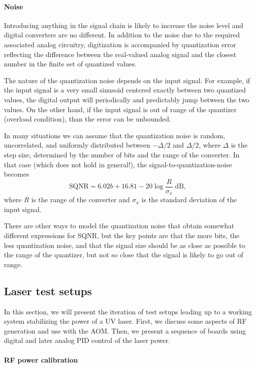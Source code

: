 \paragraph{Noise}

Introducing anything in the signal chain is likely to increase the noise level
and digital converters are no different. In addition to the noise due to the
required associated analog circuitry, digitization is accompanied by
quantization error reflecting the difference between the real-valued analog
signal and the closest number in the finite set of quantized values.

The nature of the quantization noise depends on the input signal. For example,
if the input signal is a very small sinusoid centered exactly between two
quantized values, the digital output will periodically and predictably jump
between the two values. On the other hand, if the input signal is out of range
of the quantizer (overload condition), than the error can be unbounded.

In many situations we can assume that the quantization noise is random,
uncorrelated, and uniformly distributed between $-\Delta/2$ and $\Delta/2$,
where $\Delta$ is the step size, determined by the number of bits and the range
of the converter. In that case (which does not hold in general!), the
signal-to-quantization-noise becomes \cite[sect~6.3.3]{proakis2006digital}
%
\[
   \text{SQNR}=6.02b+16.81-20\log\frac{R}{\sigma_x}\;\text{dB},
\]
%
where $R$ is the range of the converter and $\sigma_x$ is the standard deviation
of the input signal.

There are other ways to model the quantization noise that obtain somewhat
different expressions for SQNR, but the key points are that the more bits, the
less quantization noise, and that the signal size should be as close as possible
to the range of the quantizer, but not so close that the signal is likely to go
out of range.

\subsection{Laser test setups}

In this section, we will present the iteration of test setups leading up to a
working system stabilizing the power of a UV laser. First, we discuss some
aspects of RF generation and use with the AOM. Then, we present a sequence of
boards using digital and later analog PID control of the laser power.

\paragraph{RF power calibration}

